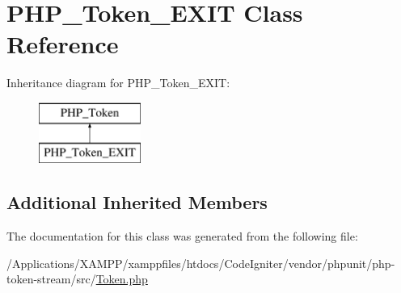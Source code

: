 \hypertarget{class_p_h_p___token___e_x_i_t}{}\section{P\+H\+P\+\_\+\+Token\+\_\+\+E\+X\+IT Class Reference}
\label{class_p_h_p___token___e_x_i_t}
Inheritance diagram for P\+H\+P\+\_\+\+Token\+\_\+\+E\+X\+IT\+:\begin{figure}[H]
\begin{center}
\leavevmode
\includegraphics[height=2.000000cm]{class_p_h_p___token___e_x_i_t}
\end{center}
\end{figure}
\subsection*{Additional Inherited Members}


The documentation for this class was generated from the following file\+:\begin{DoxyCompactItemize}
\item 
/\+Applications/\+X\+A\+M\+P\+P/xamppfiles/htdocs/\+Code\+Igniter/vendor/phpunit/php-\/token-\/stream/src/\mbox{\hyperlink{_token_8php}{Token.\+php}}\end{DoxyCompactItemize}
